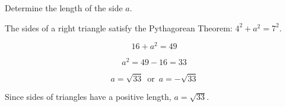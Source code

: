 \documentclass{ximera}
\begin{document}
\begin{example} 




Determine the length of the side $a$. 






\begin{image}[3in]
  \end{image}



\begin{explanation}

The sides of a right triangle satisfy the Pythagorean Theorem: $4^2 + a^2 = 7^2$.


\[  16 + a^2 = 49       \]

\[  a^2 = 49 - 16 = 33     \]

\[  a = \sqrt{33} \, \text{ or } \, a = -\sqrt{33}    \]



Since sides of triangles have a positive length, $a = \sqrt{33}$.



\end{explanation}




\end{example}
\end{document}
